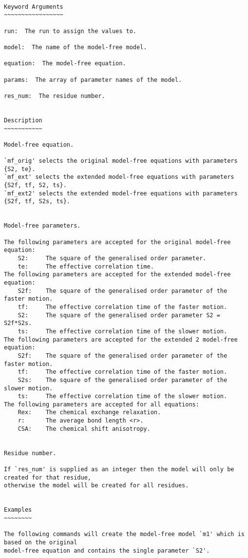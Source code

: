 {\scriptsize
\begin{verbatim}

Keyword Arguments
~~~~~~~~~~~~~~~~~

run:  The run to assign the values to.

model:  The name of the model-free model.

equation:  The model-free equation.

params:  The array of parameter names of the model.

res_num:  The residue number.


Description
~~~~~~~~~~~

Model-free equation.

`mf_orig' selects the original model-free equations with parameters {S2, te}.
`mf_ext' selects the extended model-free equations with parameters {S2f, tf, S2, ts}.
`mf_ext2' selects the extended model-free equations with parameters {S2f, tf, S2s, ts}.


Model-free parameters.

The following parameters are accepted for the original model-free equation:
    S2:     The square of the generalised order parameter.
    te:     The effective correlation time.
The following parameters are accepted for the extended model-free equation:
    S2f:    The square of the generalised order parameter of the faster motion.
    tf:     The effective correlation time of the faster motion.
    S2:     The square of the generalised order parameter S2 = S2f*S2s.
    ts:     The effective correlation time of the slower motion.
The following parameters are accepted for the extended 2 model-free equation:
    S2f:    The square of the generalised order parameter of the faster motion.
    tf:     The effective correlation time of the faster motion.
    S2s:    The square of the generalised order parameter of the slower motion.
    ts:     The effective correlation time of the slower motion.
The following parameters are accepted for all equations:
    Rex:    The chemical exchange relaxation.
    r:      The average bond length <r>.
    CSA:    The chemical shift anisotropy.


Residue number.

If `res_num' is supplied as an integer then the model will only be created for that residue,
otherwise the model will be created for all residues.


Examples
~~~~~~~~

The following commands will create the model-free model `m1' which is based on the original
model-free equation and contains the single parameter `S2'.


\end{verbatim}}
